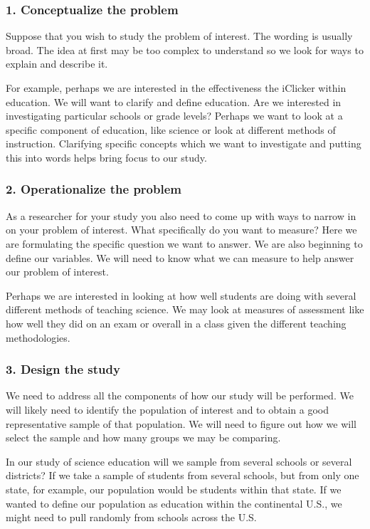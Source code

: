\documentclass[11pt]{book}\usepackage[]{graphicx}\usepackage[]{color}
\begin{document}
\subsubsection{1. Conceptualize the problem} 

Suppose that you wish to study the problem of interest.  The wording is usually broad. The idea at first may be too complex to understand so we look for ways to explain and describe it.

For example, perhaps we are interested in the effectiveness the iClicker within education.  We will want to clarify and define education.  Are we interested in investigating particular schools or grade levels?  Perhaps we want to look at a specific component of education, like science or look at different methods of instruction.   Clarifying specific concepts which we want to investigate and putting this into words helps bring focus to our study.

\subsubsection{2. Operationalize the problem}

As a researcher for your study you also need to come up with ways to narrow in on your problem of interest.  What specifically do you want to measure?  Here we are formulating the specific question we want to answer.  We are also beginning to define our variables.  We will need to know what we can measure to help answer our problem of interest.

Perhaps we are interested in looking at how well students are doing with several different methods of teaching science.  We may look at measures of assessment like how well they did on an exam or overall in a class given the different teaching methodologies.

\subsubsection{3. Design the study}

We need to address all the components of how our study will be performed.  We will likely need to identify the population of interest and to obtain a good representative sample of that population.  We will need to figure out how we will select the sample and how many groups we may be comparing.

In our study of science education will we sample from several schools or several districts?  If we take a sample of students from several schools, but from only one state, for example, our population would be students within that state.  If we wanted to define our population as education within the continental U.S., we might need to pull randomly from schools across the U.S.
\end{document}
